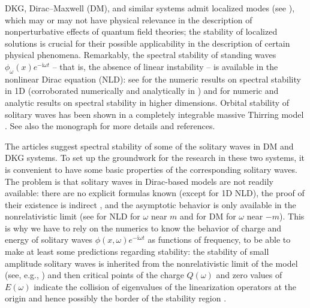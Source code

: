 \documentclass[12pt]{extarticle}
\newcommand{\jj}{\mathrm{i}}
\theoremstyle{plain}
\theoremstyle{remark}
\begin{document}
DKG, Dirac--Maxwell (DM),
and similar systems
admit localized modes
(see \cite{esteban1996stationary,abenda1998solitary,MR2593110}),
which may or may not have physical relevance
in the description of nonperturbative effects of quantum field theories;
the stability
of localized solutions
is crucial for their possible applicability
in the description of certain physical phenomena.
Remarkably, the spectral stability of standing waves
$\phi_\omega(x)e^{-\jj\omega t}$
-- that is, the absence of linear instability --
is available
in the nonlinear Dirac equation (NLD):
see
\cite{berkolaiko2012spectral}
for the numeric results on spectral stability
in 1D
(corroborated numerically and
analytically in
\cite{arxiv:1707.01946,lakoba2018numerical,aldunate2023results})
and
\cite{PhysRevLett.116.214101,boussaid2019spectral}
for numeric and analytic results
on spectral stability in higher dimensions.
Orbital stability of solitary waves
has been shown
in a completely integrable massive Thirring model \cite{pelinovsky2014orbital,MR3462129}.
See also the monograph
\cite{boussaid2019nonlinear} for more details
and references.

The articles
\cite{comech2013polarons,comech2025stable}
suggest spectral stability of
some of the solitary waves in
DM and DKG systems.
To set up the groundwork for the research
in these two systems,
it is convenient to have some basic properties of
the corresponding solitary waves.
The problem is that solitary waves
in Dirac-based models
are not readily available:
there are no explicit formulas known
(except for 1D NLD),
the proof of their existence is indirect
\cite{esteban1996stationary},
and the asymptotic behavior is only available
in the nonrelativistic limit
(see
\cite{boussaid2017nonrelativistic}
for NLD for $\omega$ near $m$
and \cite{comech2018small}
for DM
for $\omega$ near $-m$).
This is why we have to rely on the numerics
to know the behavior of charge and energy
of solitary waves $\phi(x,\omega)e^{-\jj\omega t}$
as functions of frequency,
to be able to make at least some predictions
regarding stability:
the stability of small amplitude solitary waves
is inherited from the nonrelativistic limit of the model
(see, e.g., \cite{comech2014linear,boussaid2019spectral})
and then critical points of
the charge $Q(\omega)$
and zero values of $E(\omega)$
indicate the collision of eigenvalues of the
linearization operators at the origin and hence
possibly the border of the stability region
\cite{berkolaiko2015vakhitov}.
\end{document}
